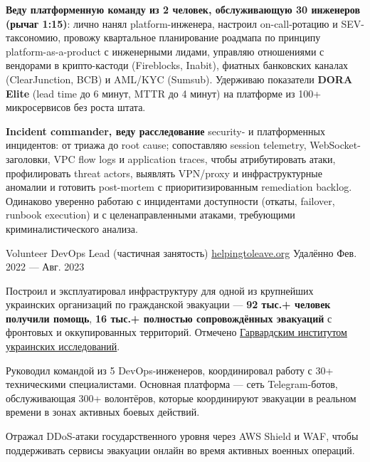\documentclass[10pt, a4paper]{awesome-cv}
\begin{document}
\begin{cventries}
{\begin{cvitems}
        \item {\textbf{Веду платформенную команду из 2 человек, обслуживающую 30 инженеров (рычаг 1:15)}: лично нанял platform-инженера, настроил on-call-ротацию и SEV-таксономию, провожу квартальное планирование роадмапа по принципу platform-as-a-product с инженерными лидами, управляю отношениями с вендорами в крипто-кастоди (Fireblocks, Inabit), фиатных банковских каналах (ClearJunction, BCB) и AML/KYC (Sumsub). Удерживаю показатели \textbf{DORA Elite} (lead time до 6 минут, MTTR до 4 минут) на платформе из 100+ микросервисов без роста штата.}
        \item {\textbf{Incident commander, веду расследование} security- и платформенных инцидентов: от триажа до root cause; сопоставляю session telemetry, WebSocket-заголовки, VPC flow logs и application traces, чтобы атрибутировать атаки, профилировать threat actors, выявлять VPN/proxy и инфраструктурные аномалии и готовить post-mortem с приоритизированным remediation backlog. Одинаково уверенно работаю с инцидентами доступности (откаты, failover, runbook execution) и с целенаправленными атаками, требующими криминалистического анализа.}
      \end{cvitems}
    }

  \cventry
    {Volunteer DevOps Lead (частичная занятость)}
    {\href{https://helpingtoleave.org}{helpingtoleave.org}}
    {Удалённо}
    {Фев. 2022 — Авг. 2023}
    {
      \begin{cvitems}
        \item {Построил и эксплуатировал инфраструктуру для одной из крупнейших украинских организаций по гражданской эвакуации --- \textbf{92 тыс.+ человек получили помощь}, \textbf{16 тыс.+ полностью сопровождённых эвакуаций} с фронтовых и оккупированных территорий. Отмечено \href{https://huri.harvard.edu/news/uchitelka-rufina-bazlova-tetiana-kulykivska-russias-war-against-ukraine-bilingual}{Гарвардским институтом украинских исследований}.}
        \item {Руководил командой из 5 DevOps-инженеров, координировал работу с 30+ техническими специалистами. Основная платформа --- сеть Telegram-ботов, обслуживающая 300+ волонтёров, которые координируют эвакуации в реальном времени в зонах активных боевых действий.}
        \item {Отражал DDoS-атаки государственного уровня через AWS Shield и WAF, чтобы поддерживать сервисы эвакуации онлайн во время активных военных операций.}
      \end{cvitems}
    }


\end{cventries}
\end{document}
